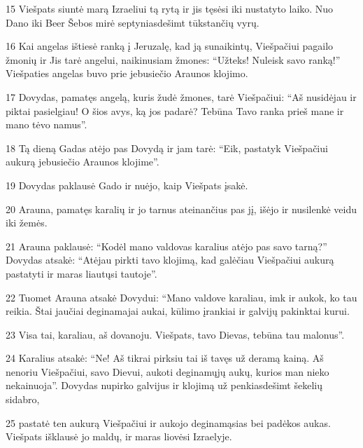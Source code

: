 \par 15 Viešpats siuntė marą Izraeliui tą rytą ir jis tęsėsi iki nustatyto laiko. Nuo Dano iki Beer Šebos mirė septyniasdešimt tūkstančių vyrų. 
\par 16 Kai angelas ištiesė ranką į Jeruzalę, kad ją sunaikintų, Viešpačiui pagailo žmonių ir Jis tarė angelui, naikinusiam žmones: “Užteks! Nuleisk savo ranką!” Viešpaties angelas buvo prie jebusiečio Araunos klojimo. 
\par 17 Dovydas, pamatęs angelą, kuris žudė žmones, tarė Viešpačiui: “Aš nusidėjau ir piktai pasielgiau! O šios avys, ką jos padarė? Tebūna Tavo ranka prieš mane ir mano tėvo namus”. 
\par 18 Tą dieną Gadas atėjo pas Dovydą ir jam tarė: “Eik, pastatyk Viešpačiui aukurą jebusiečio Araunos klojime”. 
\par 19 Dovydas paklausė Gado ir nuėjo, kaip Viešpats įsakė. 
\par 20 Arauna, pamatęs karalių ir jo tarnus ateinančius pas jį, išėjo ir nusilenkė veidu iki žemės. 
\par 21 Arauna paklausė: “Kodėl mano valdovas karalius atėjo pas savo tarną?” Dovydas atsakė: “Atėjau pirkti tavo klojimą, kad galėčiau Viešpačiui aukurą pastatyti ir maras liautųsi tautoje”. 
\par 22 Tuomet Arauna atsakė Dovydui: “Mano valdove karaliau, imk ir aukok, ko tau reikia. Štai jaučiai deginamajai aukai, kūlimo įrankiai ir galvijų pakinktai kurui. 
\par 23 Visa tai, karaliau, aš dovanoju. Viešpats, tavo Dievas, tebūna tau malonus”. 
\par 24 Karalius atsakė: “Ne! Aš tikrai pirksiu tai iš tavęs už deramą kainą. Aš nenoriu Viešpačiui, savo Dievui, aukoti deginamųjų aukų, kurios man nieko nekainuoja”. Dovydas nupirko galvijus ir klojimą už penkiasdešimt šekelių sidabro, 
\par 25 pastatė ten aukurą Viešpačiui ir aukojo deginamąsias bei padėkos aukas. Viešpats išklausė jo maldų, ir maras liovėsi Izraelyje.




